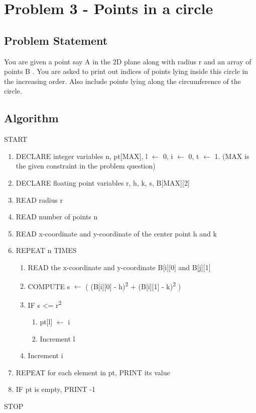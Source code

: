 \documentclass{article}
\begin{document}
\section{Problem 3 - Points in a circle}
\subsection{Problem Statement}
You are given a point say A in the 2D plane along with radius r and an array of points B . You are asked to print out indices of points lying inside this circle in the increasing order. Also include points lying along the circumference of the circle.
\subsection{Algorithm}
START
\begin{flushleft}
\begin{enumerate}
    \item DECLARE integer variables n, pt[MAX], l $\leftarrow$ 0, i $\leftarrow$ 0, t $\leftarrow$ 1. (MAX is the given constraint in the problem question)
    \item DECLARE floating point variables r, h, k, s, B[MAX][2]
    \item READ radius r
    \item READ number of points n
    \item READ x-coordinate and y-coordinate of the center point h and k
    \item REPEAT n TIMES
    \begin{enumerate}
        \item READ the x-coordinate and y-coordinate B[i][0] and B[j][1]
        \item COMPUTE s $\leftarrow$ ( (B[i][0] - h)\textsuperscript{2} + (B[i][1] - k)\textsuperscript{2} )
        \item IF s <= r\textsuperscript{2}
        \begin{enumerate}
            \item pt[l] $\leftarrow$ i
            \item Increment l
        \end{enumerate}
        \item Increment i
    \end{enumerate}
    \item REPEAT for each element in pt, PRINT its value
    \item IF pt is empty, PRINT -1
\end{enumerate}
\end{flushleft}
STOP
\end{document}
